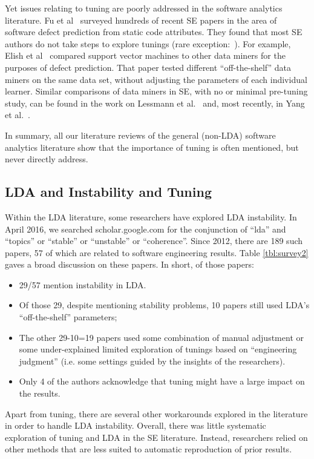 \documentclass[twocolumn,5p,sort&compress]{elsarticle}
\newcommand{\bi}{\begin{itemize}}
\newcommand{\ei}{\end{itemize}}
\theoremstyle{break}
\begin{document}
Yet issues relating to
tuning are poorly addressed in the software analytics literature.  Fu et al~\cite{fu2016tuning} surveyed hundreds of recent SE papers in the area
of software defect prediction from static code attributes. They found that most SE
  authors do not take steps to explore tunings (rare exception:~\cite{tantithamthavorn2016icse}). For example, Elish et
  al~\cite{elish2008predicting} compared support vector machines to other data
  miners for the purposes of defect prediction. That paper tested different
  ``off-the-shelf'' data miners on the same data set, without adjusting the
  parameters of each individual learner. Similar comparisons of data miners in SE,
with no or minimal pre-tuning study, can be found in the work on Lessmann et al.~\cite{4527256}
and, most recently, in Yang et al.~\cite{Yang:2016}.  

In summary, all our literature reviews of the general  (non-LDA) software analytics literature
show that
the importance of tuning is often mentioned, but never directly address.

\subsection{LDA and  Instability and Tuning}
\label{sect:solutions}
Within the LDA literature, some researchers
have explored LDA instability.
In April 2016, we searched scholar.google.com for the conjunction of ``lda'' and ``topics'' or ``stable'' or
``unstable'' or ``coherence''. Since 2012, there are  189 such papers, 57
of which are related to software engineering results. Table \ref{tbl:survey2} gaves a broad discussion on these papers. In short, of those papers:
\bi
\item 29/57
mention instability in LDA. %
\item Of those 29, despite mentioning stability problems,
  10 papers still used LDA's ``off-the-shelf'' parameters;
  \item The  other 29-10=19 papers used some combination of manual adjustment or some
under-explained limited exploration of tunings based on ``engineering judgment''
(i.e. some settings guided by the insights of the researchers).
\item
Only 4 of the authors acknowledge that tuning might have a large impact
on the results.
\ei
Apart from tuning, there are several other workarounds explored in the literature
in order to handle LDA instability. Overall, there was little systematic exploration of tuning and LDA in the SE literature.
Instead, researchers relied on other methods that are less suited to automatic reproduction of prior results.
\end{document}
